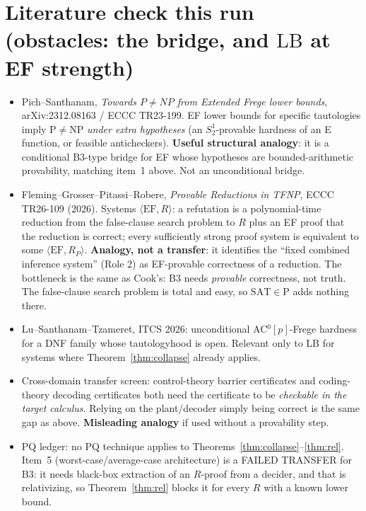 \documentclass[11pt]{article}
\theoremstyle{definition}
\begin{document}
\section{Literature check this run (obstacles: the bridge, and $\mathrm{LB}$ at EF strength)}
\begin{itemize}
\item Pich--Santhanam, \emph{Towards $P\ne NP$ from Extended Frege lower bounds}, arXiv:2312.08163 / ECCC TR23-199. EF lower bounds for specific tautologies imply $\mathrm{P}\ne\mathrm{NP}$ \emph{under extra hypotheses} (an $S^1_2$-provable hardness of an E function, or feasible anticheckers). \textbf{Useful structural analogy}: it is a conditional B3-type bridge for EF whose hypotheses are bounded-arithmetic provability, matching item~1 above. Not an unconditional bridge.
\item Fleming--Grosser--Pitassi--Robere, \emph{Provable Reductions in TFNP}, ECCC TR26-109 (2026). Systems $\langle\mathrm{EF},R\rangle$: a refutation is a polynomial-time reduction from the false-clause search problem to $R$ plus an EF proof that the reduction is correct; every sufficiently strong proof system is equivalent to some $\langle\mathrm{EF},R_P\rangle$. \textbf{Analogy, not a transfer}: it identifies the ``fixed combined inference system'' (Role 2) as EF-provable correctness of a reduction. The bottleneck is the same as Cook's: B3 needs \emph{provable} correctness, not truth. The false-clause search problem is total and easy, so $\mathrm{SAT}\in\mathrm{P}$ adds nothing there.
\item Lu--Santhanam--Tzameret, ITCS 2026: unconditional AC$^0[p]$-Frege hardness for a DNF family whose tautologyhood is open. Relevant only to $\mathrm{LB}$ for systems where Theorem~\ref{thm:collapse} already applies.
\item Cross-domain transfer screen: control-theory barrier certificates and coding-theory decoding certificates both need the certificate to be \emph{checkable in the target calculus}. Relying on the plant/decoder simply being correct is the same gap as above. \textbf{Misleading analogy} if used without a provability step.
\item PQ ledger: no PQ technique applies to Theorems~\ref{thm:collapse}--\ref{thm:rel}. Item~5 (worst-case/average-case architecture) is a FAILED TRANSFER for B3: it needs black-box extraction of an $R$-proof from a decider, and that is relativizing, so Theorem~\ref{thm:rel} blocks it for every $R$ with a known lower bound.
\end{itemize}
\end{document}
